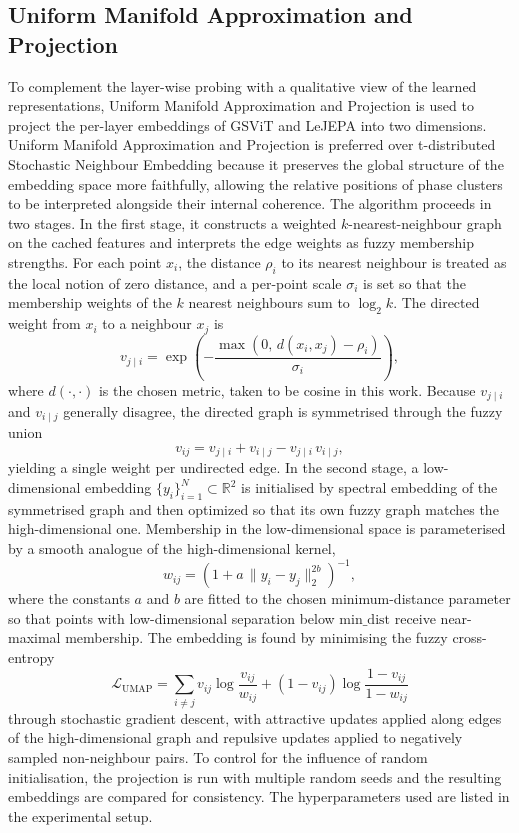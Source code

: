 \documentclass[11pt, a4paper]{article}
\begin{document}
\subsection{Uniform Manifold Approximation and Projection}
\label{sec:umap}
To complement the layer-wise probing with a qualitative view of the learned representations, Uniform Manifold Approximation and Projection \parencite{mcinnes-2018} is used to project the per-layer embeddings of GSViT and LeJEPA into two dimensions. Uniform Manifold Approximation and Projection is preferred over t-distributed Stochastic Neighbour Embedding \parencite{van-der-maaten-2008} because it preserves the global structure of the embedding space more faithfully, allowing the relative positions of phase clusters to be interpreted alongside their internal coherence. The algorithm proceeds in two stages. In the first stage, it constructs a weighted $k$-nearest-neighbour graph on the cached features and interprets the edge weights as fuzzy membership strengths. For each point $x_i$, the distance $\rho_i$ to its nearest neighbour is treated as the local notion of zero distance, and a per-point scale $\sigma_i$ is set so that the membership weights of the $k$ nearest neighbours sum to $\log_2 k$. The directed weight from $x_i$ to a neighbour $x_j$ is
\begin{equation}
v_{j \mid i} = \exp\!\left(-\frac{\max\!\left(0,\, d(x_i, x_j) - \rho_i\right)}{\sigma_i}\right),
\end{equation}
where $d(\cdot, \cdot)$ is the chosen metric, taken to be cosine in this work. Because $v_{j \mid i}$ and $v_{i \mid j}$ generally disagree, the directed graph is symmetrised through the fuzzy union
\begin{equation}
v_{ij} = v_{j \mid i} + v_{i \mid j} - v_{j \mid i}\, v_{i \mid j},
\end{equation}
yielding a single weight per undirected edge. In the second stage, a low-dimensional embedding $\{y_i\}_{i=1}^{N} \subset \mathbb{R}^2$ is initialised by spectral embedding of the symmetrised graph and then optimized so that its own fuzzy graph matches the high-dimensional one. Membership in the low-dimensional space is parameterised by a smooth analogue of the high-dimensional kernel,
\begin{equation}
w_{ij} = \left(1 + a\, \|y_i - y_j\|_2^{2b}\right)^{-1},
\end{equation}
where the constants $a$ and $b$ are fitted to the chosen minimum-distance parameter so that points with low-dimensional separation below $\mathrm{min\_dist}$ receive near-maximal membership. The embedding is found by minimising the fuzzy cross-entropy
\begin{equation}
\mathcal{L}_{\mathrm{UMAP}} = \sum_{i \neq j} v_{ij} \log\frac{v_{ij}}{w_{ij}} + (1 - v_{ij}) \log\frac{1 - v_{ij}}{1 - w_{ij}}
\end{equation}
through stochastic gradient descent, with attractive updates applied along edges of the high-dimensional graph and repulsive updates applied to negatively sampled non-neighbour pairs. To control for the influence of random initialisation, the projection is run with multiple random seeds and the resulting embeddings are compared for consistency. The hyperparameters used are listed in the experimental setup.
\end{document}
